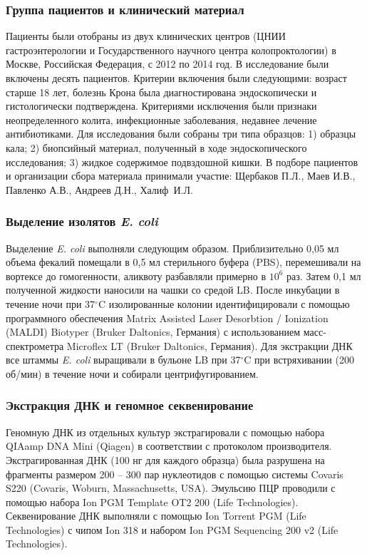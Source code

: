 \subsubsection*{Группа пациентов и клинический материал}
Пациенты были отобраны из двух клинических центров (ЦНИИ гастроэнтерологии и Государственного научного центра колопроктологии) в Москве, Российская Федерация, с 2012 по 2014 год. В исследование были включены десять пациентов. Критерии включения были следующими: возраст старше 18 лет, болезнь Крона была диагностирована эндоскопически и гистологически подтверждена. Критериями исключения были признаки неопределенного колита, инфекционные заболевания, недавнее лечение антибиотиками. 
Для исследования были собраны три типа образцов: 1) образцы кала; 2) биопсийный материал, полученный в ходе эндоскопического исследования; 3) жидкое содержимое подвздошной кишки. В подборе пациентов и организации сбора материала принимали участие: Щербаков П.Л., Маев И.В., Павленко А.В., Андреев Д.Н., Халиф~И.Л.

\subsubsection*{Выделение изолятов \textit{E. coli}}

Выделение \textit{E. coli} выполняли следующим образом. Приблизительно 0,05 мл объема фекалий помещали в 0,5 мл стерильного буфера (PBS), перемешивали на вортексе до гомогенности, аликвоту разбавляли примерно в $10^6$ раз. Затем 0,1 мл полученной жидкости наносили на чашки со средой LB. После инкубации в течение ночи при 37$^\circ$C изолированные колонии идентифицировали с помощью программного обеспечения Matrix Assisted Laser Desorbtion / Ionization (MALDI) Biotyper (Bruker Daltonics, Германия) с использованием масс-спектрометра Microflex LT (Bruker Daltonics, Германия). Для экстракции ДНК все штаммы \textit{E. coli} выращивали в бульоне LB при 37$^\circ$C при встряхивании (200 об/мин) в течение ночи и собирали центрифугированием.


\subsubsection*{Экстракция ДНК и геномное секвенирование}

Геномную ДНК из отдельных культур экстрагировали с помощью набора QIAamp DNA Mini (Qiagen) в соответствии с протоколом производителя. Экстрагированная ДНК (100 нг для каждого образца) была разрушена на фрагменты размером 200 – 300 пар нуклеотидов с помощью системы Covaris S220 (Covaris, Woburn, Massachusetts, USA). Эмульсию ПЦР проводили с помощью набора Ion PGM Template OT2 200 (Life Technologies). Секвенирование ДНК выполняли с помощью Ion Torrent PGM (Life Technologies) с чипом Ion 318 и набором Ion PGM Sequencing 200 v2 (Life Technologies). 

